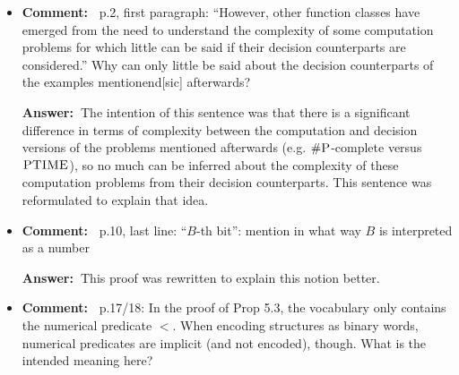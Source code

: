 \documentclass[a4paper]{article}
\newcommand{\ans}{{\bf Answer:\ }}
\newcommand{\cm}[1]{{\bf Comment:\ } #1}
\begin{document}
\begin{itemize}
	\setlength\itemsep{0.5em}
	\item \cm{p.2, first paragraph: ``However, other function classes have emerged from the need to understand	the complexity of some computation problems for which little can be said if their decision counterparts are considered.'' Why can only little be said about the decision counterparts of the examples mentionend[sic] afterwards?}
	
	\ans The intention of this sentence was that there is a significant difference in terms of complexity between the computation and decision versions of the problems mentioned afterwards (e.g. $\#\textsc{P}$-complete versus $\textsc{PTIME}$), so no much can be inferred about the complexity of these computation problems from their decision counterparts. This sentence was reformulated to explain that idea.
	
	\item \cm{p.10, last line: ``$B$-th bit'': mention in what way $B$ is interpreted as a number}
	
	\ans This proof was rewritten to explain this notion better.
	
	\item \cm{p.17/18: In the proof of Prop 5.3, the vocabulary only contains the numerical predicate $<$. When encoding structures as binary words, numerical predicates are implicit (and not encoded), though. What is the intended meaning here?}
	

\end{itemize}
\end{document}
